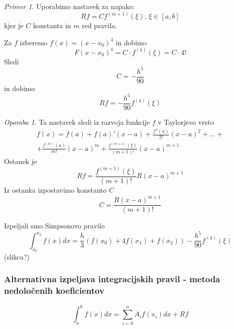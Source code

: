 \documentclass[a4paper,12pt]{article}
\theoremstyle{definition}
\theoremstyle{remark}
\newtheorem*{ex}{Primer}
\newtheorem*{rem}{Opomba}
\begin{document}
\begin{ex}
    Uporabimo nastavek za napako:
    \begin{equation*}
        Rf = C f^{(m+1)} (\xi) \text{, } \xi \in [a, b]
    \end{equation*}
    kjer je $C$ konstanta in $m$ red pravila.

    Za $f$ izberemo $f(x) = (x-x_0)^4$ in dobimo
    \begin{equation*}
        F(x-x_0)^4 = C \cdot f^{(4)} (\xi) = C\cdot4!
    \end{equation*}
    Sledi
    \begin{equation*}
        C = -\frac{h^5}{90}
    \end{equation*}
    in dobimo
    \begin{equation*}
        Rf = -\frac{h^5}{90}f^{(4)}(\xi)
    \end{equation*}

    \begin{rem}
        Ta nastavek sledi iz razvoja funkcije $f$ v Taylorjevo vrsto
        \begin{multline*}
            f(x) = f(a) + f(a)'(x-a) + \frac{f''(a)}{2!} (x-a)^2 + \dots + \\
            + \frac{f^{(m)}(a)}{m!} (x-a)^m + \frac{f^{(m+1)}(\xi)}{(m+1)!} (x-a)^{m+1}
        \end{multline*}
        Ostanek je
        \begin{equation*}
            Rf = \frac{f^{(m+1)}(\xi)}{(m+1)!} R(x-a)^{m+1}
        \end{equation*}
        Iz ostanka izpostavimo konstanto $C$
        \begin{equation*}
            C = \frac{R(x-a)^{m+1}}{(m+1)!}
        \end{equation*}
    \end{rem}

    Izpeljali smo Simpsonovo pravilo
    \begin{equation*}
        \int_{x_0}^{x_2} f(x) dx = \frac{h}{3} (f(x_0) + 4f(x_1) + f(x_2)) - \frac{h^5}{90} f^{(4)}(\xi)
    \end{equation*}
    (slikca?)
\end{ex}

\subsubsection{Alternativna izpeljava integracijskih pravil - metoda nedoločenih koeficientov}
\begin{equation*}
    \int_{a}^{b} f(x) dx = \sum_{i=0}^{n} A_i f(x_i) dx + Rf
\end{equation*}
\end{document}
